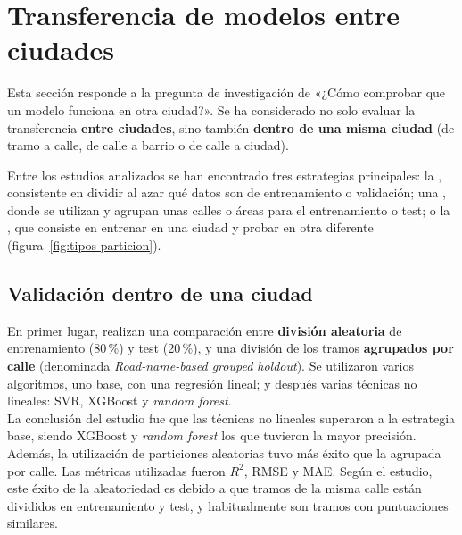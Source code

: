 \section{Transferencia de modelos entre ciudades}
\label{sec:transferencia-ciudades}

Esta sección responde a la pregunta de investigación de «¿Cómo comprobar que un modelo funciona en otra ciudad?». Se ha considerado no solo evaluar la transferencia \textbf{entre ciudades}, sino también \textbf{dentro de una misma ciudad} (de tramo a calle, de calle a barrio o de calle a ciudad).
\\



Entre los estudios analizados se han encontrado tres estrategias principales: la \textbf{}, consistente en dividir al azar qué datos son de entrenamiento o validación; una \textbf{}, donde se utilizan y agrupan unas calles o áreas para el entrenamiento o test; o la \textbf{}, que consiste en entrenar en una ciudad y probar en otra diferente (figura~\ref{fig:tipos-particion}).
\\

\subsection{Validación dentro de una ciudad}
\label{subsec:validacion-dentro}

En primer lugar, \textcite{wu2026} realizan una comparación entre \textbf{división aleatoria} de entrenamiento (80\,\%) y test (20\,\%), y una división de los tramos \textbf{agrupados por calle} (denominada \textit{Road-name-based grouped holdout}). Se utilizaron varios algoritmos, uno base, con una regresión lineal; y después varias técnicas no lineales: \gls{SVR}, XGBoost y \textit{random forest}.
\\

La conclusión del estudio fue que las técnicas no lineales superaron a la estrategia base, siendo XGBoost y \textit{random forest} los que tuvieron la mayor precisión. Además, la utilización de particiones aleatorias tuvo más éxito que la agrupada por calle. Las métricas utilizadas fueron $R^2$, \gls{RMSE} y \gls{MAE}.
Según el estudio, este éxito de la aleatoriedad es debido a que tramos de la misma calle están divididos en entrenamiento y test, y habitualmente son tramos con puntuaciones similares.
\\


